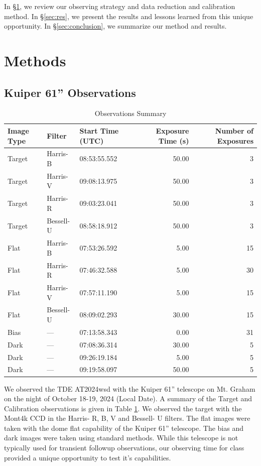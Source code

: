 \documentclass{aastex631}
\begin{document}
In \S\ref{sec:method}, we review our observing strategy and data reduction and calibration method. In \S\ref{sec:res}, we present the results and lessons learned from this unique opportunity. In \S\ref{sec:conclusion}, we summarize our method and results.

\section{Methods}\label{sec:method}
\subsection{Kuiper 61'' Observations}

\begin{table}
  \centering
  \caption{Observations Summary}
  \label{tab:obs}
  \begin{tabular}{lllrr}
    \hline
    Image Type & Filter & Start Time (UTC) & Exposure Time (s) & Number of Exposures \\
    \hline
    Target & Harris-B & 08:53:55.552 & 50.00 & 3 \\
    Target & Harris-V & 09:08:13.975 & 50.00 & 3 \\
    Target & Harris-R & 09:03:23.041 & 50.00 & 3 \\
    Target & Bessell-U & 08:58:18.912 & 50.00 & 3 \\
    Flat & Harris-B & 07:53:26.592 & 5.00 & 15 \\
    Flat & Harris-R & 07:46:32.588 & 5.00 & 30 \\
    Flat & Harris-V & 07:57:11.190 & 5.00 & 15 \\
    Flat & Bessell-U & 08:09:02.293 & 30.00 & 15 \\
    Bias & --- & 07:13:58.343 & 0.00 & 31 \\
    Dark & --- & 07:08:36.314 & 30.00 & 5 \\
    Dark & --- & 09:26:19.184 & 5.00 & 5 \\
    Dark & --- & 09:19:58.097 & 50.00 & 5 \\
    \hline
  \end{tabular}
\end{table}

We observed the TDE AT2024wsd with the Kuiper 61'' telescope on Mt. Graham on the night of October 18-19, 2024 (Local Date). A summary of the Target and Calibration observations is given in Table \ref{tab:obs}. We observed the target with the Mont4k CCD in the Harris- R, B, V and Bessell- U filters. The flat images were taken with the dome flat capability of the Kuiper 61'' telescope. The bias and dark images were taken using standard methods. While this telescope is not typically used for transient followup observations, our observing time for class provided a unique opportunity to test it's capabilities. 
\end{document}
